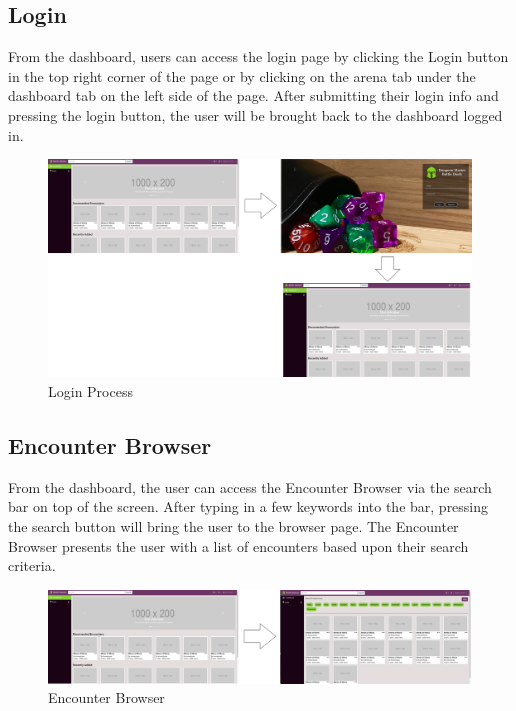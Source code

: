 \documentclass[12pt,a4paper]{report}
\begin{document}
		\subsection{Login}
		From the dashboard, users can access the login page by clicking the Login button in the top right corner of the page or by clicking on the arena tab under the dashboard tab on the left side of the page. After submitting their login info and pressing the login button, the user will be brought back to the dashboard logged in. 
		\begin{figure}[H]
			\centering
			\centerline{\includegraphics[scale=.10]{loginNav}}
			\caption{Login Process}
			\label{fig: Login Page}
		\end{figure}
		\newpage
		\subsection{Encounter Browser}
		From the dashboard, the user can access the Encounter Browser via the search bar on top of the screen. After typing in a few keywords into the bar, pressing the search button will bring the user to the browser page. The Encounter Browser presents the user with a list of encounters based upon their search criteria. 
		\begin{figure}[H]
			\centering
			\centerline{\includegraphics[scale=.16]{browserNav}}
			\caption{Encounter Browser}
			\label{fig: Dashboard to Browser}
		\end{figure}
\end{document}
